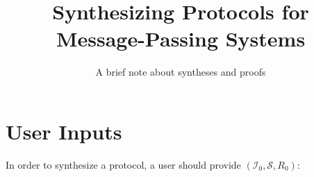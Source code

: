 \documentclass[format=manuscript]{acmart}
\begin{document}
\title{Synthesizing Protocols for Message-Passing Systems}
\subtitle{A brief note about syntheses and proofs}

\makeatletter
\renewcommand\@formatdoi[1]{\ignorespaces}
\makeatother

\maketitle


\newcommand{\todo}[1]{\textcolor{red}{TODO}: #1}

\newcommand{\valOf}[1]{\ensuremath{#1.\texttt{v}}}
\newcommand{\stOf}[1]{\ensuremath{#1.\texttt{st}}}
\newcommand{\trsOf}[1]{\ensuremath{#1.\texttt{trs}}}
\newcommand{\trsYes}{\ensuremath{\top}}
\newcommand{\trsNo}{\ensuremath{\bot}}

\newcommand{\objGetRq}[1]{\ensuremath{#1.\texttt{getRq()}}}
\newcommand{\objGetRs}[2]{\ensuremath{#1:\texttt{getRs(}#2\texttt{)}}}
\newcommand{\objSetRq}[2]{\ensuremath{#1.\texttt{setRq(}#2\texttt{)}}}
\newcommand{\objSetRs}[1]{\ensuremath{#1:\texttt{setRs()}}}

\newcommand{\intGetRq}[2]{\ensuremath{#1 \leadsto #2.\texttt{getRq()}}}
\newcommand{\intGetRs}[3]{\ensuremath{#1 \leadsto #2.\texttt{getRs(}#3\texttt{)}}}
\newcommand{\intSetRq}[2]{\ensuremath{#1 \leadsto #2.\texttt{setRq()}}}
\newcommand{\intSetRs}[2]{\ensuremath{#1 \leadsto #2.\texttt{setRs()}}}
\newcommand{\intInvRq}[2]{\ensuremath{#1 \leadsto #2.\texttt{invRq()}}}
\newcommand{\intInvRs}[3]{\ensuremath{#1 \leadsto #2.\texttt{invRs(}#3\texttt{)}}}

\newcommand{\msgrule}[4]{\ensuremath{#1\vdash \{ #2 \} \xrightarrow{#3} \{ #4 \}}}

\newcommand{\refSec}[1]{[Section~\ref{#1}]}
\newcommand{\refInv}[1]{[Invariant~\ref{#1}]}
\newcommand{\refTrs}[1]{[Transition~\ref{#1}]}
\newcommand{\refFig}[1]{[Figure~\ref{#1}]}

\newcommand{\eg}{\emph{e.g.}}
\newcommand{\ie}{\emph{i.e.}}

\section{User Inputs}

In order to synthesize a protocol, a user should provide $(\mathcal{I}_0,
\mathcal{S}, R_0)$:
\end{document}
